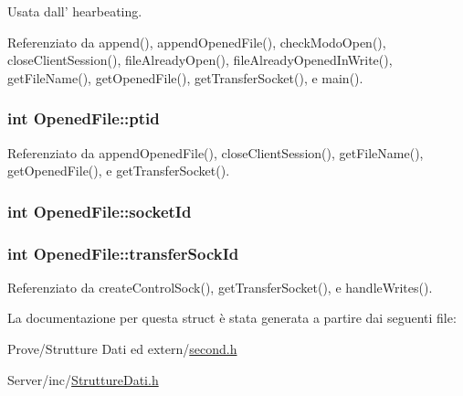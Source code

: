 Usata dall' hearbeating. 



Referenziato da append(), append\+Opened\+File(), check\+Modo\+Open(), close\+Client\+Session(), file\+Already\+Open(), file\+Already\+Opened\+In\+Write(), get\+File\+Name(), get\+Opened\+File(), get\+Transfer\+Socket(), e main().

\hypertarget{structOpenedFile_aba1e9ae457adfa6a9cc6a22ca4ee290d}{
\subsubsection[{ptid}]{\setlength{\rightskip}{0pt plus 5cm}int Opened\+File\+::ptid}}\label{structOpenedFile_aba1e9ae457adfa6a9cc6a22ca4ee290d}


Referenziato da append\+Opened\+File(), close\+Client\+Session(), get\+File\+Name(), get\+Opened\+File(), e get\+Transfer\+Socket().

\hypertarget{structOpenedFile_a2af35018ecff06dbd349d464c815038a}{
\subsubsection[{socket\+Id}]{\setlength{\rightskip}{0pt plus 5cm}int Opened\+File\+::socket\+Id}}\label{structOpenedFile_a2af35018ecff06dbd349d464c815038a}
\hypertarget{structOpenedFile_a122a7d3d722dc1f7c63857af2024f098}{
\subsubsection[{transfer\+Sock\+Id}]{\setlength{\rightskip}{0pt plus 5cm}int Opened\+File\+::transfer\+Sock\+Id}}\label{structOpenedFile_a122a7d3d722dc1f7c63857af2024f098}


Referenziato da create\+Control\+Sock(), get\+Transfer\+Socket(), e handle\+Writes().



La documentazione per questa struct è stata generata a partire dai seguenti file\+:\begin{DoxyCompactItemize}
\item 
Prove/\+Strutture Dati ed extern/\hyperlink{second_8h}{second.\+h}\item 
Server/inc/\hyperlink{StruttureDati_8h}{Strutture\+Dati.\+h}\end{DoxyCompactItemize}
